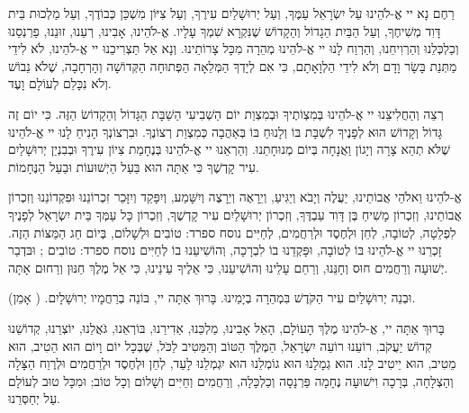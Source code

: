 רַחֶם נָא יי אֱ-לֹהֵינוּ עַל יִשְׂרָאֵל עַמֶּךָ, וְעַל יְרוּשָׁלַיִם עִירֶךָ, וְעַל צִיּוֹן מִשְׁכַּן כְּבוֹדֶךָ, וְעַל מַלְכוּת בֵּית דָּוִד מְשִׁיחֶךָ, וְעַל הַבַּיִת הַגָדוֹל וְהַקָדוֹשׁ שֶׁנִּקְרָא שִׁמְךָ עָלָיו. אֱ-לֹהֵינוּ, אָבִינוּ, רְעֵנוּ, זוּנֵנוּ, פַרְנְסֵנוּ וְכַלְכְּלֵנוּ וְהַרְוִיחֵנוּ, וְהַרְוַח לָנוּ יי אֱ-לֹהֵינוּ מְהֵרָה מִכָּל צָרוֹתֵינוּ. וְנָא אַל תַּצְרִיכֵנוּ יי אֱ-לֹהֵינוּ, לֹא לִידֵי מַתְּנַת בָּשָׂר וָדָם וְלֹא לִידֵי הַלְוָאָתָם, כִּי אִם לְיָדְךָ הַמְּלֵאָה הַפְּתוּחָה הַקְּדוֹשָׁה וְהָרְחָבָה, שֶׁלֹא נֵבוֹשׁ וְלֹא נִכָּלֵם לְעוֹלָם וָעֶד.

\break
\begin{framed}

רְצֵה וְהַחֲלִיצֵנוּ יי אֱ-לֹהֵינוּ בְּמִצְוֹתֶיךָ וּבְמִצְוַת יוֹם הַשְׁבִיעִי הַשַׁבָּת הַגָּדוֹל וְהַקָדוֹשׂ הַזֶּה. כִּי יוֹם זֶה גָּדוֹל וְקָדוֹשׁ הוּא לְפָנֶיךָ לִשְׁבָּת בּוֹ וְלָנוּחַ בּוֹ בְּאַהֲבָה כְּמִצְוַת רְצוֹנֶךָ. וּבִרְצוֹנְךָ הָנִיחַ לָנוּ יי אֱ-לֹהֵינוּ שֶׁלֹּא תְהֵא צָרָה וְיָגוֹן וַאֲנָחָה בְּיוֹם מְנוּחָתֵנוּ. וְהַרְאֵנוּ יי אֱ-לֹהֵינוּ בְּנֶחָמַת צִיוֹן עִירֶךָ וּבְבִנְיַן יְרוּשָׁלַיִם עִיר קָדְשֶׁךָ כִּי אַתָּה הוּא בַּעַל הַיְשׁוּעוֹת וּבַעַל הַנֶּחָמוֹת.
\end{framed}

אֱ-לֹהֵינוּ וֵאלֹהֵי אֲבוֹתֵינוּ, יַעֲלֶה וְיָבֹא וְיַגִּיעַ, וְיֵרָאֶה וְיֵרָצֶה וְיִשָּׁמַע, וְיִפָּקֵד וְיִזָּכֵר זִכְרוֹנֵנוּ וּפִקְדוֹנֵנוּ וְזִכְרוֹן אֲבוֹתֵינוּ, וְזִכְרוֹן מָשִׁיחַ בֶּן דָּוִד עַבְדֶּךָ, וְזִכְרוֹן יְרוּשָׁלַיִם עִיר קָדְשֶׁךָ, וְזִכְרוֹן כָּל עַמְּךָ בֵּית יִשְׂרָאֵל לְפָנֶיךָ לִפְלֵטָה, לְטוֹבָה, לְחֵן וּלְחֶסֶד וּלְרַחֲמִים, לְחַיִּים נוסח ספרד: טוֹבִים וּלְשָׁלוֹם, בְּיוֹם חַג הַמַּצּוֹת הַזֶה. זָכְרֵנוּ יי אֱ-לֹהֵינוּ בּוֹ לְטוֹבָה, וּפָּקְדֵנוּ בוֹ לִבְרָכָה, וְהוֹשִׁיעֵנוּ בוֹ לְחַיִּים נוסח ספרד: טוֹבִים ; וּבּדְבַר יְשׁוּעָה וְרַחֲמִים חוּס וְחָנֵּנוּ, וְרַחֵם עָלֵינוּ וְהוֹשִׁיעֵנוּ, כִּי אֵלֶיךָ עֵינֵינוּ, כִּי אֵל מֶלֶךְ חַנּוּן וְרַחוּם אָתָּה.

וּבְנֵה יְרוּשָׁלַיִם עִיר הַקֹּדֶשׁ בִּמְהֵרָה בְיָמֵינוּ. בָּרוּךְ אַתָּה יי, בּוֹנֵה בְרַחֲמָיו יְרוּשָׁלָיִם. ( אָמֵן).

בָּרוּךְ אַתָּה יי, אֱ-לֹהֵינוּ מֶלֶךְ הָעוֹלָם, הָאֵל אָבִינוּ, מַלְכֵּנוּ, אַדִירֵנוּ, בּוֹרְאֵנוּ, גֹּאֲלֵנוּ, יוֹצְרֵנוּ, קְדוֹשֵׁנוּ קְדוֹשׁ יַעֲקֹב, רוֹעֵנוּ רוֹעֵה יִשְׂרָאַל, הַמֶּלֶךְ הַטּוֹב וְהַמֵּטִיב לַכֹּל, שֶׁבְּכָל יוֹם וָיוֹם הוּא הֵטִיב, הוּא מֵטִיב, הוּא יֵיטִיב לָנוּ. הוּא גְמָלָנוּ הוּא גוֹמְלֵנוּ הוּא יִגְמְלֵנוּ לָעַד, לְחֵן וּלְחֶסֶד וּלְרַחֲמִים וּלְרֶוַח הַצָּלָה וְהַצְלָחָה, בְּרָכָה וִישׁוּעָה נֶחָמָה פַּרְנָסָה וְכַלְכָּלָה, וְרַחֲמִים וְחַיִּים וְשָׁלוֹם וְכָל טוֹב; וּמִכָּל טוּב לְעוֹלָם עַל יְחַסְּרֵנוּ.

